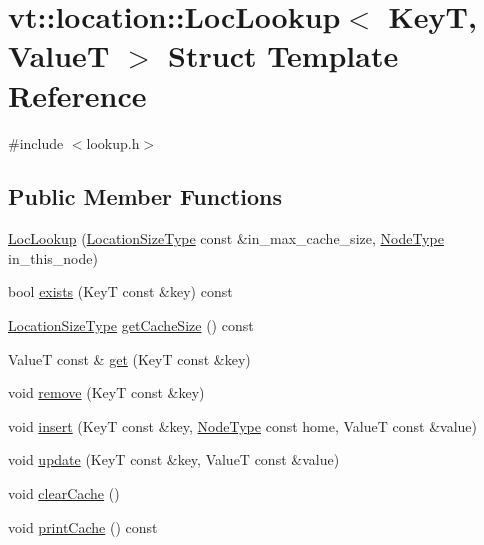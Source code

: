 \hypertarget{structvt_1_1location_1_1_loc_lookup}{}\section{vt\+:\+:location\+:\+:Loc\+Lookup$<$ KeyT, ValueT $>$ Struct Template Reference}
\label{structvt_1_1location_1_1_loc_lookup}


{\ttfamily \#include $<$lookup.\+h$>$}

\subsection*{Public Member Functions}
\begin{DoxyCompactItemize}
\item 
\hyperlink{structvt_1_1location_1_1_loc_lookup_a27e5f79af811503f9c0652b9f1be35b8}{Loc\+Lookup} (\hyperlink{namespacevt_1_1location_ab1c4c5849012a23eee2fbd1fce6159d7}{Location\+Size\+Type} const \&in\+\_\+max\+\_\+cache\+\_\+size, \hyperlink{namespacevt_a866da9d0efc19c0a1ce79e9e492f47e2}{Node\+Type} in\+\_\+this\+\_\+node)
\item 
bool \hyperlink{structvt_1_1location_1_1_loc_lookup_ad1c4809e9687c975335fee019cc3e39b}{exists} (KeyT const \&key) const
\item 
\hyperlink{namespacevt_1_1location_ab1c4c5849012a23eee2fbd1fce6159d7}{Location\+Size\+Type} \hyperlink{structvt_1_1location_1_1_loc_lookup_a95081b04f2cd212457ec56c579ba988b}{get\+Cache\+Size} () const
\item 
ValueT const  \& \hyperlink{structvt_1_1location_1_1_loc_lookup_a3be47c30312499b386c2d459b4b81c9f}{get} (KeyT const \&key)
\item 
void \hyperlink{structvt_1_1location_1_1_loc_lookup_a6c82de648f51e3242bd7430d185041fe}{remove} (KeyT const \&key)
\item 
void \hyperlink{structvt_1_1location_1_1_loc_lookup_a63ff201b384e4f65c02b3a99b8ba543e}{insert} (KeyT const \&key, \hyperlink{namespacevt_a866da9d0efc19c0a1ce79e9e492f47e2}{Node\+Type} const home, ValueT const \&value)
\item 
void \hyperlink{structvt_1_1location_1_1_loc_lookup_a95e6e8096c0d9c5a76727ebbf441995a}{update} (KeyT const \&key, ValueT const \&value)
\item 
void \hyperlink{structvt_1_1location_1_1_loc_lookup_aae2c3e418b59b36c0a53da17fe7fb3b8}{clear\+Cache} ()
\item 
void \hyperlink{structvt_1_1location_1_1_loc_lookup_a03bf48e7c5af3720c13e00ead13c83a0}{print\+Cache} () const
\end{DoxyCompactItemize}


